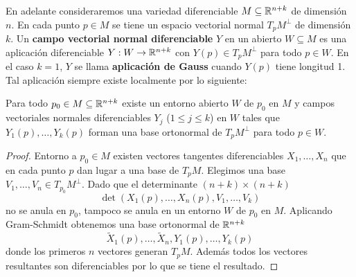 \documentclass[CV.tex]{subfiles}
\begin{document}
En adelante consideraremos una variedad diferenciable $M\subseteq\mathbb{R}^{n+k}$ de dimensión $n$. En cada punto $p\in M$ se tiene un espacio vectorial normal $T_pM^{\perp}$ de dimensión $k$. Un \textbf{campo vectorial normal diferenciable} $Y$ en un abierto $W\subseteq M$ es una aplicación diferenciable $Y:W\to\mathbb{R}^{n+k}$ con $Y(p)\in T_pM^{\perp}$ para todo $p\in W$. En el caso $k=1$, $Y$ se llama \textbf{aplicación de Gauss} cuando $Y(p)$ tiene longitud 1. Tal aplicación siempre existe localmente por lo siguiente:

\begin{lemma}
Para todo $p_0\in M\subseteq\mathbb{R}^{n+k}$ existe un entorno abierto $W$ de $p_0$ en $M$ y campos vectoriales normales diferenciables $Y_j$ ($1\leq j\leq k$) en $W$ tales que $Y_1(p),\dots, Y_k(p)$ forman una base ortonormal de $T_pM^{\perp}$ para todo $p\in W$.
\end{lemma}
\begin{proof}
Entorno a $p_0\in M$ existen vectores tangentes diferenciables $X_1,\dots, X_n$ que en cada punto $p$ dan lugar a una base de $T_pM$. Elegimos una base $V_1,\dots, V_n\in T_{p_0}M^{\perp}$. Dado que el determinante $(n+k)\times(n+k)$
\[
\det(X_1(p),\dots, X_n(p),V_1,\dots, V_k)
\]
no se anula en $p_0$, tampoco se anula en un entorno $W$ de $p_0$ en $M$. Aplicando Gram-Schmidt obtenemos una base ortonormal de $\mathbb{R}^{n+k}$
\[
\widetilde{X}_1(p),\dots, \widetilde{X}_n, Y_1(p),\dots, Y_k(p)
\]
donde los primeros $n$ vectores generan $T_pM$. Además todos los vectores resultantes son diferenciables por lo que se tiene el resultado.
\end{proof}
\end{document}

